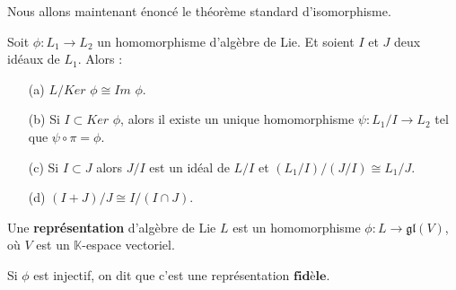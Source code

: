\documentclass[a4paper,openany,12pt]{report}
\newcommand{\KK}{\mathbb{K}}
\newcommand{\gl}{\mathfrak{gl}}
\theoremstyle{break}
{\theorembodyfont{\upshape}
\newtheorem*{rmq}{Remarque :}
\newtheorem*{prv}{Preuve :}
\newtheorem*{ex}{Exemples :}
\newtheorem*{exe}{Exemple : }
\newtheorem*{nota}{Notation :}
\newtheorem*{dem}{D\'emonstration :}}
\begin{document}
\quad Nous allons maintenant énoncé le théorème standard d'isomorphisme.

\begin{thm}\label{thm:iso}
Soit $\phi: L_{1}  \to L_{2} $ un homomorphisme d'algèbre de Lie. Et soient $I$ et $J$ deux idéaux de $L_{1}$.
Alors :
\begin{itemize}
\item[(a)] $L / Ker$ $\phi \cong Im$ $\phi$.
\item[(b)] Si $I \subset Ker$ $\phi$, alors il existe un unique homomorphisme $\psi: L_{1} / I \to L_{2} $ tel que $\psi \circ \pi= \phi$.
\item[(c)] Si $I \subset J$ alors $J / I$ est un idéal de $L/ I$ et $(L_{1} / I) /(J / I)\cong L_{1} / J$.
\item[(d)] $(I+J) / J \cong I /(I \cap J)$.
\end{itemize}
\end{thm}

\begin{df}
\quad  Une \textbf{représentation} d’algèbre de Lie $L$ est un homomorphisme $\phi: L \rightarrow \gl(V)$, où $V$ est un $\KK$-espace vectoriel.

Si $\phi$ est injectif, on dit que c'est une représentation  $\textbf{fidèle}$.
\end{df}
\end{document}
